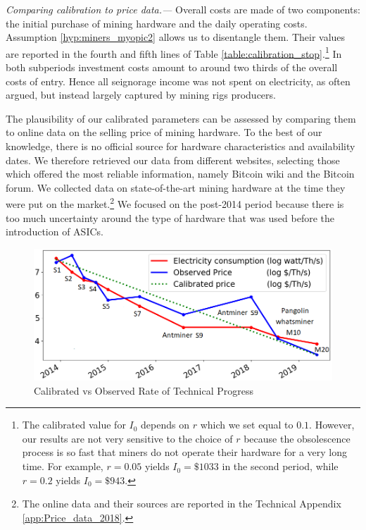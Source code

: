 \documentclass[12pt, a4paper]{article}
\begin{document}
\textit{Comparing calibration to price data.---} Overall costs are made of two
components: the initial purchase of mining hardware and the daily operating costs.
Assumption \ref{hyp:miners_myopic2} allows us to disentangle
them. Their values are reported in
the fourth and fifth lines of Table \ref{table:calibration_stop}.\footnote{%
The calibrated value for $I_0$ depends on $r$ which we set equal to $0.1$.
However, our results are not very sensitive to the
choice of $r$ because the obsolescence process is so fast that miners do not
operate their hardware for a very long time. For example, $r=0.05$ yields $%
I_0=\$1033$ in the second period, while $r=0.2$ yields $I_0=\$943$.} In both subperiods
investment costs amount to around two thirds of the overall costs of entry.
Hence all seignorage income was not spent on electricity, as often argued, but
instead largely captured by mining rigs producers.

The plausibility of our calibrated parameters can be assessed by comparing them to online data on the selling price of mining hardware.
To the best of our knowledge, there is no official source for hardware characteristics and availability dates. We therefore retrieved our data from different websites, selecting those which offered the most reliable information, namely Bitcoin wiki and the Bitcoin forum. We collected data on state-of-the-art mining hardware at the time they were put on the market.\footnote{The online data and their sources are reported in the
Technical Appendix \ref{app:Price_data_2018}.} We focused on the post-2014 period because there is too much uncertainty around the
type of hardware that was used before the introduction of ASICs.

\begin{figure}[]
\caption{Calibrated vs Observed Rate of Technical Progress}
\label{fig:a_observed_simulated}\centering
\includegraphics[scale=0.65]{images/all_sample_a_baseline}
\end{figure}
\end{document}

